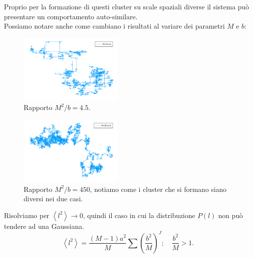 Proprio per la formazione di questi cluster su scale spaziali diverse il sistema può presentare un comportamento auto-similare.\\
Possiamo notare anche come cambiano i risultati al variare dei parametri $M$ e $b$:
\begin{figure}[H]
    \centering
    \includegraphics[width=0.45\textwidth]{figures/lez_10_Weier_M_3_b_2.png}
    \caption{\scriptsize Rapporto $M^2 / b = 4.5$.}
    \label{fig:figures-lez_10_Weier_M_3_b_2-png}
\end{figure}
\begin{figure}[H]
    \centering
    \includegraphics[width=0.45\textwidth]{figures/lez_10_Weier_M_30_b_2.png}
    \caption{\scriptsize Rapporto $M^2 / b = 450$, notiamo come i cluster che si formano siano diversi nei due casi.}
    \label{fig:figures-lez_10_Weier_M_3_b_2-png}
\end{figure}

Risolviamo per $\left<l^2\right>\to 0$, quindi il caso in cui la distribuzione $P(l)$  non può tendere ad una Gaussiana.
\[
    \left<l^2\right> = \frac{\left(M-1\right)a^2}{M}\sum_{}^{} \left(\frac{b^2}{M}\right)^J; \quad \frac{b^2}{M}>1
.\] 

